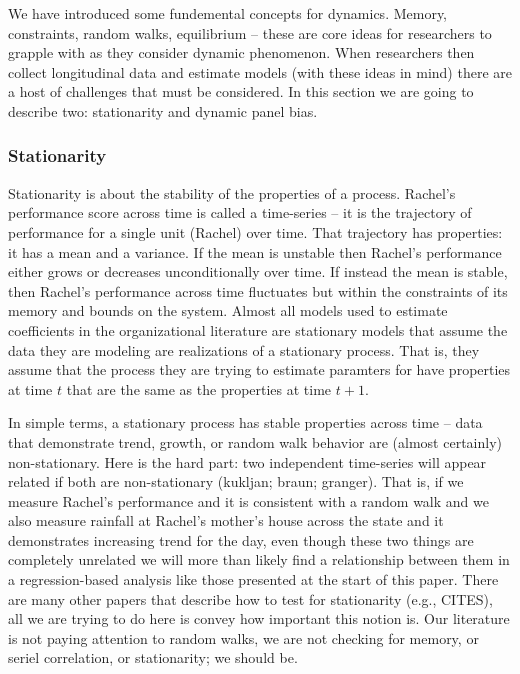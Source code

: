 \documentclass[english,,man]{apa6}
\theoremstyle{definition}
\theoremstyle{definition}
\theoremstyle{definition}
\theoremstyle{remark}
\begin{document}
We have introduced some fundemental concepts for dynamics. Memory,
constraints, random walks, equilibrium -- these are core ideas for
researchers to grapple with as they consider dynamic phenomenon. When
researchers then collect longitudinal data and estimate models (with
these ideas in mind) there are a host of challenges that must be
considered. In this section we are going to describe two: stationarity
and dynamic panel bias.

\hypertarget{stationarity}{%
\subsubsection{Stationarity}\label{stationarity}}

Stationarity is about the stability of the properties of a process.
Rachel's performance score across time is called a time-series -- it is
the trajectory of performance for a single unit (Rachel) over time. That
trajectory has properties: it has a mean and a variance. If the mean is
unstable then Rachel's performance either grows or decreases
unconditionally over time. If instead the mean is stable, then Rachel's
performance across time fluctuates but within the constraints of its
memory and bounds on the system. Almost all models used to estimate
coefficients in the organizational literature are stationary models that
assume the data they are modeling are realizations of a stationary
process. That is, they assume that the process they are trying to
estimate paramters for have properties at time \(t\) that are the same
as the properties at time \(t + 1\).

In simple terms, a stationary process has stable properties across time
-- data that demonstrate trend, growth, or random walk behavior are
(almost certainly) non-stationary. Here is the hard part: two
independent time-series will appear related if both are non-stationary
(kukljan; braun; granger). That is, if we measure Rachel's performance
and it is consistent with a random walk and we also measure rainfall at
Rachel's mother's house across the state and it demonstrates increasing
trend for the day, even though these two things are completely unrelated
we will more than likely find a relationship between them in a
regression-based analysis like those presented at the start of this
paper. There are many other papers that describe how to test for
stationarity (e.g., CITES), all we are trying to do here is convey how
important this notion is. Our literature is not paying attention to
random walks, we are not checking for memory, or seriel correlation, or
stationarity; we should be.
\end{document}
